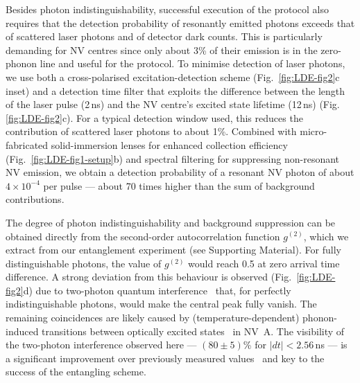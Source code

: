 Besides photon indistinguishability, successful execution of the protocol also requires that the detection probability of resonantly emitted photons exceeds that of scattered laser photons and of detector dark counts. This is particularly demanding for NV centres since only about 3\% of their emission is in the zero-phonon line and useful for the protocol. To minimise detection of laser photons, we use both a cross-polarised excitation-detection scheme (Fig.~\ref{fig:LDE-fig2}c inset) and a detection time filter that exploits the difference between the length of the laser pulse (2$\,$ns) and the NV centre's excited state lifetime (12\,ns) (Fig.\,\ref{fig:LDE-fig2}c). For a typical detection window used, this reduces the contribution of scattered laser photons to about 1\%. Combined with micro-fabricated solid-immersion lenses for enhanced collection efficiency (Fig.~\ref{fig:LDE-fig1-setup}b) and spectral filtering for suppressing non-resonant NV emission, we obtain a detection probability of a resonant NV photon of about $4\times10^{-4}$ per pulse --- about 70 times higher than the sum of background contributions.

The degree of photon indistinguishability and background suppression can be obtained directly from the second-order autocorrelation function $g^{(2)}$, which we extract from our entanglement experiment (see Supporting Material). For fully distinguishable photons, the value of $g^{(2)}$ would reach 0.5 at zero arrival time difference. A strong deviation from this behaviour is observed (Fig.~\ref{fig:LDE-fig2}d) due to two-photon quantum interference~\cite{Hong_Phys.Rev.Lett._1987} that, for perfectly indistinguishable photons, would make the central peak fully vanish. The remaining coincidences are likely caused by (temperature-dependent) phonon-induced transitions between optically excited states~\cite{Fu_Phys.Rev.Lett._2009} in NV~A. The visibility of the two-photon interference observed here --- $(80\pm5)$\% for $|dt| < 2.56\,$ns --- is a significant improvement over previously measured values~\cite{Bernien_Phys.Rev.Lett._2012,Sipahigil_Phys.Rev.Lett._2012} and key to the success of the entangling scheme.

